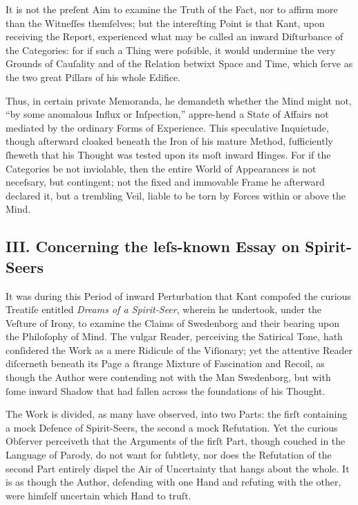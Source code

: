 \documentclass[12pt]{article}
\begin{document}
It is not the preſent Aim to examine the Truth of the Fact, nor to affirm more 
than the Witneſſes themſelves; but the intereſting Point is that Kant, upon 
receiving the Report, experienced what may be called an inward Diſturbance of 
the Categories: for if such a Thing were poſsible, it would undermine the 
very Grounds of Cauſality and of the Relation betwixt Space and Time, which 
ſerve as the two great Pillars of his whole Edifice.

Thus, in certain private Memoranda, he demandeth whether the Mind might not, 
“by some anomalous Influx or Inſpection,” appre-hend a State of Affairs not 
mediated by the ordinary Forms of Experience. This speculative Inquietude, 
though afterward cloaked beneath the Iron of his mature Method, ſufficiently 
ſheweth that his Thought was tested upon its moſt inward Hinges. For if the 
Categories be not inviolable, then the entire World of Appearances is not 
neceſsary, but contingent; not the fixed and immovable Frame he afterward 
declared it, but a trembling Veil, liable to be torn by Forces within or 
above the Mind.

\subsection*{III. Concerning the leſs-known Essay on Spirit-Seers}

It was during this Period of inward Perturbation that Kant compoſed the 
curious Treatiſe entitled \textit{Dreams of a Spirit-Seer}, wherein he 
undertook, under the Veſture of Irony, to examine the Claims of Swedenborg and 
their bearing upon the Philoſophy of Mind. The vulgar Reader, perceiving the 
Satirical Tone, hath conſidered the Work as a mere Ridicule of the Viſionary; 
yet the attentive Reader diſcerneth beneath its Page a ſtrange Mixture of 
Fascination and Recoil, as though the Author were contending not with the Man 
Swedenborg, but with ſome inward Shadow that had fallen across the
foundations of his Thought.

The Work is divided, as many have observed, into two Parts: the firſt 
containing a mock Defence of Spirit-Seers, the second a mock Refutation. Yet 
the curious Obſerver perceiveth that the Arguments of the firſt Part, though 
couched in the Language of Parody, do not want for ſubtlety, nor does the 
Refutation of the second Part entirely dispel the Air of Uncertainty that 
hangs about the whole. It is as though the Author, defending with one Hand and 
refuting with the other, were himſelf uncertain which Hand to truſt.
\end{document}
